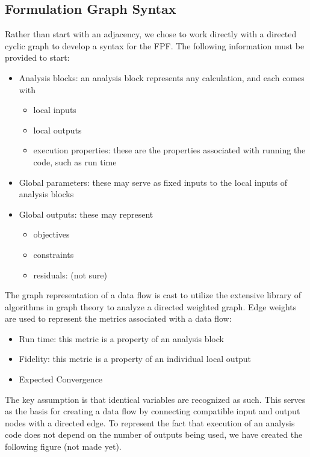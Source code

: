     \subsection{Formulation Graph Syntax}
    Rather than start with an adjacency, we chose to work directly with a directed cyclic graph to develop a syntax for the FPF. 
    The following information must be provided to start:
    \begin{itemize}
        \item Analysis blocks: an analysis block represents any calculation, and each comes with
            \begin{itemize}
                \item local inputs
                \item local outputs 
                \item execution properties: these are the properties associated with running the code, such as run time
            \end{itemize}
        \item Global parameters: these may serve as fixed inputs to the local inputs of analysis blocks
        \item Global outputs: these may represent
            \begin{itemize}
                \item objectives
                \item constraints
                \item residuals: (not sure)
            \end{itemize}
    \end{itemize}

    The graph representation of a data flow is cast to utilize the extensive library of algorithms in graph theory to analyze a directed weighted graph. 
    Edge weights are used to represent the metrics associated with a data flow:
    \begin{itemize}
        \item Run time: this metric is a property of an analysis block
        \item Fidelity: this metric is a property of an individual local output
        \item Expected Convergence
    \end{itemize}

    The key assumption is that identical variables are recognized as such. This serves as the basis for creating a data flow by connecting compatible input and output nodes with a directed edge. 
    To represent the fact that execution of an analysis code does not depend on the number of outputs being used, we have created the following figure (not made yet).
    
